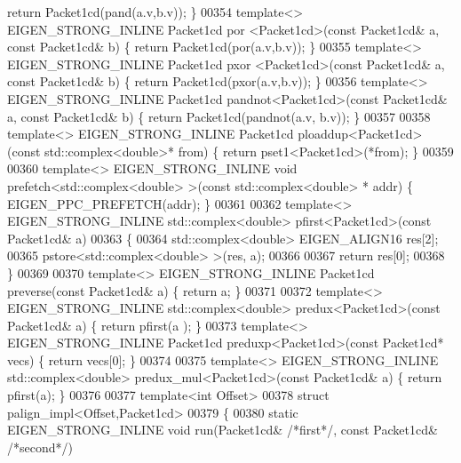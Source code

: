 \begin{DoxyCode}
{      return} Packet1cd(pand(a.v,b.v)); \}
00354 \textcolor{keyword}{template}<> EIGEN\_STRONG\_INLINE Packet1cd por    <Packet1cd>(\textcolor{keyword}{const} Packet1cd& a, \textcolor{keyword}{const} Packet1cd& b) \{ \textcolor{keywordflow}{
      return} Packet1cd(por(a.v,b.v)); \}
00355 \textcolor{keyword}{template}<> EIGEN\_STRONG\_INLINE Packet1cd pxor   <Packet1cd>(\textcolor{keyword}{const} Packet1cd& a, \textcolor{keyword}{const} Packet1cd& b) \{ \textcolor{keywordflow}{
      return} Packet1cd(pxor(a.v,b.v)); \}
00356 \textcolor{keyword}{template}<> EIGEN\_STRONG\_INLINE Packet1cd pandnot<Packet1cd>(\textcolor{keyword}{const} Packet1cd& a, \textcolor{keyword}{const} Packet1cd& b) \{ \textcolor{keywordflow}{
      return} Packet1cd(pandnot(a.v, b.v)); \}
00357 
00358 \textcolor{keyword}{template}<> EIGEN\_STRONG\_INLINE Packet1cd ploaddup<Packet1cd>(\textcolor{keyword}{const} std::complex<double>*     from)  \{ \textcolor{keywordflow}{
      return} pset1<Packet1cd>(*from); \}
00359 
00360 \textcolor{keyword}{template}<> EIGEN\_STRONG\_INLINE \textcolor{keywordtype}{void} prefetch<std::complex<double> >(\textcolor{keyword}{const} std::complex<double> * addr)    \{
       EIGEN\_PPC\_PREFETCH(addr); \}
00361 
00362 \textcolor{keyword}{template}<> EIGEN\_STRONG\_INLINE std::complex<double>  pfirst<Packet1cd>(\textcolor{keyword}{const} Packet1cd& a)
00363 \{
00364   std::complex<double> EIGEN\_ALIGN16 res[2];
00365   pstore<std::complex<double> >(res, a);
00366 
00367   \textcolor{keywordflow}{return} res[0];
00368 \}
00369 
00370 \textcolor{keyword}{template}<> EIGEN\_STRONG\_INLINE Packet1cd preverse(\textcolor{keyword}{const} Packet1cd& a) \{ \textcolor{keywordflow}{return} a; \}
00371 
00372 \textcolor{keyword}{template}<> EIGEN\_STRONG\_INLINE std::complex<double> predux<Packet1cd>(\textcolor{keyword}{const} Packet1cd& a) \{ \textcolor{keywordflow}{return} pfirst(a
      ); \}
00373 \textcolor{keyword}{template}<> EIGEN\_STRONG\_INLINE Packet1cd preduxp<Packet1cd>(\textcolor{keyword}{const} Packet1cd* vecs)        \{ \textcolor{keywordflow}{return} vecs[0];
       \}
00374 
00375 \textcolor{keyword}{template}<> EIGEN\_STRONG\_INLINE std::complex<double> predux\_mul<Packet1cd>(\textcolor{keyword}{const} Packet1cd& a) \{ \textcolor{keywordflow}{return} 
      pfirst(a); \}
00376 
00377 \textcolor{keyword}{template}<\textcolor{keywordtype}{int} Offset>
00378 \textcolor{keyword}{struct }palign\_impl<Offset,Packet1cd>
00379 \{
00380   \textcolor{keyword}{static} EIGEN\_STRONG\_INLINE \textcolor{keywordtype}{void} run(Packet1cd& \textcolor{comment}{/*first*/}, \textcolor{keyword}{const} Packet1cd& \textcolor{comment}{/*second*/})

\end{DoxyCode}
